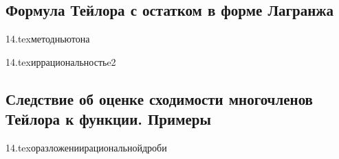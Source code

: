 \subsection{\teormin Формула Тейлора с остатком в форме Лагранжа}

{14.tex}{методньютона}

{14.tex}{иррациональностьe2}

\subsection{Следствие об оценке сходимости многочленов Тейлора к функции. Примеры}

{14.tex}{оразложениирациональнойдроби}

